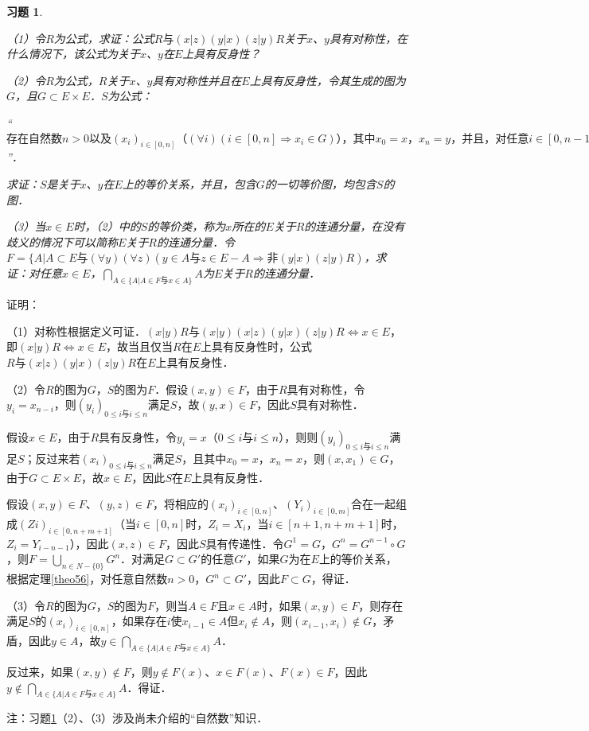\documentclass[12pt, a4paper, oneside]{book}
\newtheorem{exer}{习题}
\begin{document}
			\begin{exer}\label{exer75}
				\hfill\par
				（1）令$R$为公式，求证：公式$R\text{与}(x|z)(y|x)(z|y)R$关于$x$、$y$具有对称性，在什么情况下，该公式为关于$x$、$y$在$E$上具有反身性？
				\par
				（2）令$R$为公式，$R$关于$x$、$y$具有对称性并且在$E$上具有反身性，令其生成的图为$G$，且$G\subset E\times E$．$S$为公式：
				\par
				“$\text{存在自然数}n>0\text{以及}(x_i)_{i\in [0, n]}\text{（}(\forall i)(i\in [0, n]\Rightarrow x_i\in G)\text{），其中}x_0=x\text{，}x_n=y\text{，并且，对任意}i\in [0, n-1]\text{，}(x_{i+1}|y)(x_i|x)R\text{为真}$”．
				\par				
				求证：$S$是关于$x$、$y$在$E$上的等价关系，并且，包含$G$的一切等价图，均包含$S$的图．
				\par
				（3）当$x\in E$时，（2）中的$S$的等价类，称为$x$所在的$E$关于$R$的连通分量，在没有歧义的情况下可以简称$E$关于$R$的连通分量．令$F=\{A|A\subset E\text{与}(\forall y)(\forall z)(y\in A\text{与}z\in E-A\Rightarrow \text{非}(y|x)(z|y)R)$，求证：对任意$x\in E$，$\bigcap\limits_{A\in \{A|A\in F\text{与}x\in A\}}A$为$E$关于$R$的连通分量．
			\end{exer}
			证明：
			\par
			（1）对称性根据定义可证．$(x|y)R\text{与}(x|y)(x|z)(y|x)(z|y)R\Leftrightarrow x\in E$，即$(x|y)R\Leftrightarrow x\in E$，故当且仅当$R$在$E$上具有反身性时，公式$R\text{与}(x|z)(y|x)(z|y)R$在$E$上具有反身性．
			\par
			（2）令$R$的图为$G$，$S$的图为$F$．假设$(x, y)\in F$，由于$R$具有对称性，令$y_i=x_{n-i}$，则$(y_i)_{0\leq i\text{与} i\leq n}$满足$S$，故$(y, x) \in F$，因此$S$具有对称性．
			\par
			假设$x\in E$，由于$R$具有反身性，令$y_i=x$（$0\leq i\text{与} i\leq n$），则则$(y_i)_{0\leq i\text{与} i\leq n}$满足$S$；反过来若$(x_i)_{0\leq i\text{与} i\leq n}$满足$S$，且其中$x_0=x$，$x_n=x$，则$(x, x_1)\in G$，由于$G\subset E\times E$，故$x\in E$，因此$S$在$E$上具有反身性．
			\par
			假设$(x, y)\in F$、$(y, z)\in F$，将相应的$(x_i)_{i\in [0, n]}$、$(Y_i)_{i\in [0, m]}$合在一起组成$(Zi)_{i \in [0, n+m+1]}$（当$i\in [0, n]$时，$Z_i=X_i$，当$i\in [n+1, n+m+1]$时，$Z_i=Y_{i-n-1}$），因此$(x, z) \in F$，因此$S$具有传递性．令$G^1=G$，$G^n=G^{n-1}\circ G$，则$F=\bigcup\limits_{n\in N-\{0\}}G^n$．对满足$G \subset G'$的任意$G'$，如果$G$为在$E$上的等价关系，根据定理\ref{theo56}，对任意自然数$n>0$，$G^n\subset G'$，因此$F\subset G$，得证．
			\par
			（3）令$R$的图为$G$，$S$的图为$F$，则当$A\in F$且$x\in A$时，如果$(x, y)\in F$，则存在满足$S$的$(x_i)_{i\in [0,n]}$，如果存在$i$使$x_{i-1}\in A$但$x_i\notin A$，则$(x_{i-1}, x_i)\notin G$，矛盾，因此$y\in A$，故$y\in \bigcap\limits_{A\in \{A|A\in F\text{与}x\in A\}}A$．
			\par
			反过来，如果$(x, y)\notin F$，则$y\notin F(x)$、$x\in F(x)$、$F(x)\in F$，因此$y\notin \bigcap\limits_{A\in \{A|A\in F\text{与}x\in A\}}A$．得证．
			\par
			注：习题\ref{exer75}（2）、（3）涉及尚未介绍的“自然数”知识．
			
\end{document}
